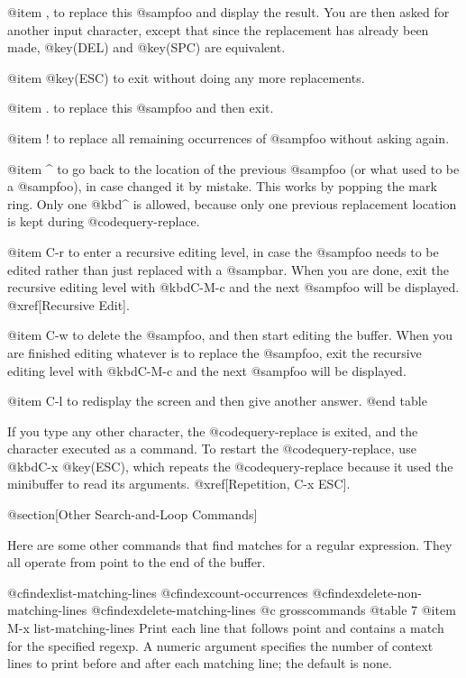 {{{{{{{{{{{{{{{{{{@item ,
to replace this @samp{foo} and display the result.  You are then asked for
another input character, except that since the replacement has already been
made, @key(DEL) and @key(SPC) are equivalent.

@item @key(ESC)
to exit without doing any more replacements.

@item .
to replace this @samp{foo} and then exit.

@item !
to replace all remaining occurrences of @samp{foo} without asking again.

@item ^
to go back to the location of the previous @samp{foo} (or what used to be
a @samp{foo}), in case changed it by mistake.  This works by popping the
mark ring.  Only one @kbd{^} is allowed, because only one previous
replacement location is kept during @code{query-replace}.

@item C-r
to enter a recursive editing level, in case the @samp{foo} needs to be
edited rather than just replaced with a @samp{bar}.  When you are done,
exit the recursive editing level with @kbd{C-M-c} and the next @samp{foo}
will be displayed.  @xref[Recursive Edit].

@item C-w
to delete the @samp{foo}, and then start editing the buffer.  When you are
finished editing whatever is to replace the @samp{foo}, exit the recursive
editing level with @kbd{C-M-c} and the next @samp{foo} will be displayed.

@item C-l
to redisplay the screen and then give another answer.
@end table

  If you type any other character, the @code{query-replace} is exited, and
the character executed as a command.  To restart the @code{query-replace},
use @kbd{C-x @key(ESC)}, which repeats the @code{query-replace} because
it used the minibuffer to read its arguments.  @xref[Repetition, C-x ESC].
  
@section[Other Search-and-Loop Commands]

  Here are some other commands that find matches for a regular expression.
They all operate from point to the end of the buffer.

@cfindex{list-matching-lines}
@cfindex{count-occurrences}
@cfindex{delete-non-matching-lines}
@cfindex{delete-matching-lines}
@c grosscommands
@table 7
@item M-x list-matching-lines
Print each line that follows point and contains a match for the specified
regexp.  A numeric argument specifies the number of context lines to print
before and after each matching line; the default is none.

}}}}}}}}}}}}}}}}}}
